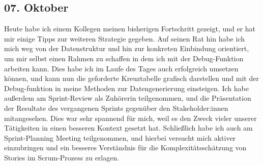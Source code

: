 \subsection{07. Oktober}
Heute habe ich einem Kollegen meinen bisherigen Fortschritt gezeigt, und er hat mir einige Tipps zur weiteren Strategie gegeben. Auf seinen Rat hin habe ich mich weg von der Datenstruktur und hin zur konkreten Einbindung orientiert, um mir selbst einen Rahmen zu schaffen in dem ich mit der Debug-Funktion arbeiten kann. Dies habe ich im Laufe des Tages auch erfolgreich umsetzen können, und kann nun die geforderte Kreuztabelle grafisch darstellen und mit der Debug-funktion in meine Methoden zur Datengenerierung einsteigen. Ich habe außerdem am Sprint-Review als Zuhörerin teilgenommen, und die Präsentation der Resultate des vergangenen Sprints gegenüber den Stakeholder:innen mitangesehen. Dies war sehr spannend für mich, weil es den Zweck vieler unserer Tätigkeiten in einen besseren Kontext gesetzt hat. Schließlich habe ich auch am Sprint-Planning Meeting teilgenommen, und hierbei versucht mich aktiver einzubringen und ein besseres Verständnis für die Komplexitätsschätzung von Stories im Scrum-Prozess zu erlagen.